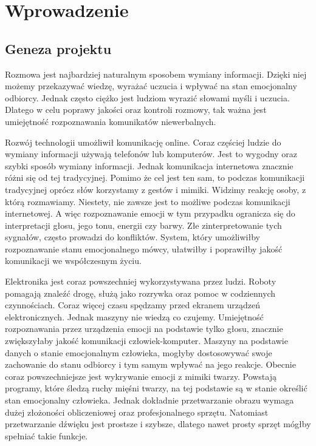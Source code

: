 \documentclass[declaration,shortabstract]{iithesis}
\author         {Elżbieta Plaszczyk}
\begin{document}
\let\cleardoublepage\clearpage
\chapter{Wprowadzenie}
\section{Geneza projektu}
Rozmowa jest najbardziej naturalnym sposobem wymiany informacji. Dzięki niej możemy przekazywać wiedzę, wyrażać uczucia i wpływać na stan emocjonalny odbiorcy.  Jednak często ciężko jest ludziom wyrazić słowami myśli i uczucia. Dlatego w celu poprawy jakości oraz kontroli rozmowy, tak ważna jest umiejętność rozpoznawania komunikatów niewerbalnych. 

Rozwój technologii umożliwił komunikację online. Coraz częściej ludzie do wymiany informacji używają telefonów lub komputerów. Jest to wygodny oraz szybki sposób wymiany informacji. Jednak komunikacja internetowa znacznie różni się od tej tradycyjnej. Pomimo że cel jest ten sam, to podczas komunikacji tradycyjnej oprócz słów korzystamy z gestów i mimiki. Widzimy reakcję osoby, z którą rozmawiamy. Niestety, nie zawsze jest to możliwe podczas komunikacji internetowej. A więc rozpoznawanie emocji w tym przypadku ogranicza się do interpretacji głosu, jego tonu, energii czy barwy. Złe zinterpretowanie tych sygnałów, często prowadzi do konfliktów. System, który umożliwiłby rozpoznawanie stanu emocjonalnego mówcy, ułatwiłby i poprawiłby jakość komunikacji we współczesnym życiu. 

Elektronika jest coraz powszechniej wykorzystywana przez ludzi. Roboty pomagają znaleźć drogę, służą jako rozrywka oraz pomoc w codziennych czynnościach. Coraz więcej czasu spędzamy przed ekranem urządzeń elektronicznych. Jednak maszyny nie wiedzą co czujemy. Umiejętność rozpoznawania przez urządzenia emocji na podstawie tylko głosu, znacznie zwiększyłaby jakość komunikacji człowiek-komputer. Maszyny na podstawie danych o stanie emocjonalnym człowieka, mogłyby dostosowywać swoje zachowanie do stanu odbiorcy i tym samym wpływać na jego reakcje. Obecnie coraz powszechniejsze jest wykrywanie emocji z mimiki twarzy. Powstają programy, które śledzą ruchy mięśni twarzy, na tej podstawie są w stanie określić stan emocjonalny człowieka. Jednak dokładnie przetwarzanie obrazu wymaga dużej złożoności obliczeniowej oraz profesjonalnego sprzętu. Natomiast przetwarzanie dźwięku jest prostsze i szybsze, dlatego nawet prosty sprzęt mógłby spełniać takie funkcje.
\end{document}
